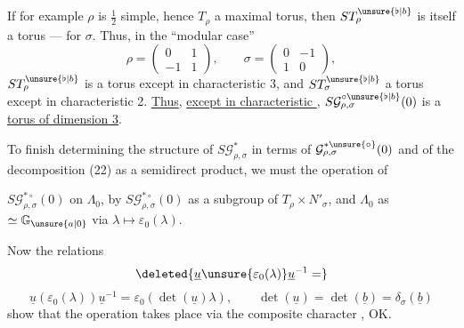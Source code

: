 If for example $\rho$  is $\frac12$ simple, hence $T_\rho$ a
maximal torus, then $ST_\rho^{\unsure{\flat|b}}$ is itself a torus  ---
 for $\sigma$. Thus,  in the ``modular case''
\[
\rho=\begin{pmatrix}0&1\\-1&1\end{pmatrix},\qquad
\sigma=\begin{pmatrix}0&-1\\1&0\end{pmatrix},
\]
$ST_\rho^{\unsure{\flat|b}}$ is a
torus  except in characteristic 3, and $ST_\sigma^{\unsure{\flat|b}}$ a torus except in
characteristic 2. \uline{Thus}, \uline{except in characteristic }, $S\mathcal{G}_{\rho,\sigma}^{\circ\unsure{\flat|b}}(0)$ is a
\uline{torus of dimension 3}.

To finish determining the structure
of $S\mathcal{G}_{\rho,\sigma}^{*}$ in terms of $\mathcal{G}_{\rho,\sigma}^{*\unsure{\circ}}(0)$ and
of the decomposition (22) as a semidirect product, we must  the operation of


$S\mathcal{G}_{\rho,\sigma}^{*\circ}(0)$ on $\Lambda_0$, by 
$S\mathcal{G}_{\rho,\sigma}^{*\circ}(0)$ as a subgroup of $T_\rho\times N'_\sigma$,
and $\Lambda_0$ as  $\simeq \mathbb{G}_{\unsure{a|0}}$ via $\lambda\mapsto\varepsilon_0(\lambda)$.

Now the relations
\[
\deleted{\underline{u}\unsure{\varepsilon_0(\lambda)}\underline{u}^{-1}=}
\]
\[
\underline{u}(\varepsilon_0(\lambda))\underline{u}^{-1}
 =\varepsilon_0(\det(\underline{u})\lambda),\qquad
\det(\underline{u})=\det(\underline{b})=\delta_\sigma(\underline{b})
\]
show that the operation takes place via
the composite character
, OK.

